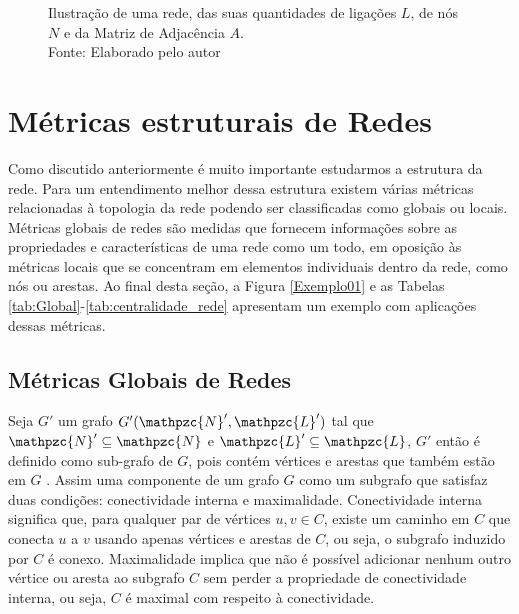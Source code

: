 \begin{figure}[H]
  \captionsetup{font=small}
  \caption*{Ilustração de uma rede, das suas quantidades de ligações $L$, de nós $N$ e da Matriz de Adjacência $A$.\\ Fonte: Elaborado pelo autor}
  \label{fig:redes}
\end{figure}

\section{Métricas estruturais de Redes}

Como discutido anteriormente é muito importante estudarmos a estrutura da rede.
Para um entendimento melhor dessa estrutura existem várias métricas~\cite{Costa2007} relacionadas à topologia da rede podendo ser classificadas como globais ou locais. 
Métricas globais de redes são medidas que fornecem informações sobre as propriedades e características de uma rede como um todo, em oposição às métricas locais que se concentram em elementos individuais dentro da rede, como nós ou arestas. 
Ao final
desta seção, a Figura \ref{Exemplo01} e as Tabelas \ref{tab:Global}-\ref{tab:centralidade_rede} apresentam um exemplo com aplicações dessas métricas.

\subsection{Métricas Globais de Redes}

Seja \( G' \) um grafo \( G'(\mathpzc{N}', \mathpzc{L}') \) tal que \( \mathpzc{N}' \subseteq \mathpzc{N} \) e \( \mathpzc{L}' \subseteq \mathpzc{L} \), \( G' \) então é definido como sub-grafo de $G$, pois contém vértices e arestas que também estão em $G$ . Assim uma componente de um grafo \( G \) como um subgrafo que satisfaz duas condições: conectividade interna e maximalidade. Conectividade interna significa que, para qualquer par de vértices \( u, v \in C \), existe um caminho em \( C \) que conecta \( u \) a \( v \) usando apenas vértices e arestas de \( C \), ou seja, o subgrafo induzido por \( C \) é conexo. Maximalidade implica que não é possível adicionar nenhum outro vértice ou aresta ao subgrafo \( C \) sem perder a propriedade de conectividade interna, ou seja, \( C \) é maximal com respeito à conectividade.


